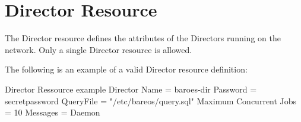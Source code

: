 \section{Director Resource}
\label{DirectorResourceDirector}
\label{DirectorResource4}

The Director resource defines the attributes of the Directors running on the
network. Only a single Director
resource is allowed.


The following is an example of a valid Director resource definition:

\begin{bconfig}{Director Ressource example}
Director {
  Name = baroes-dir
  Password = secretpassword
  QueryFile = "/etc/bareos/query.sql"
  Maximum Concurrent Jobs = 10
  Messages = Daemon
}
\end{bconfig}



